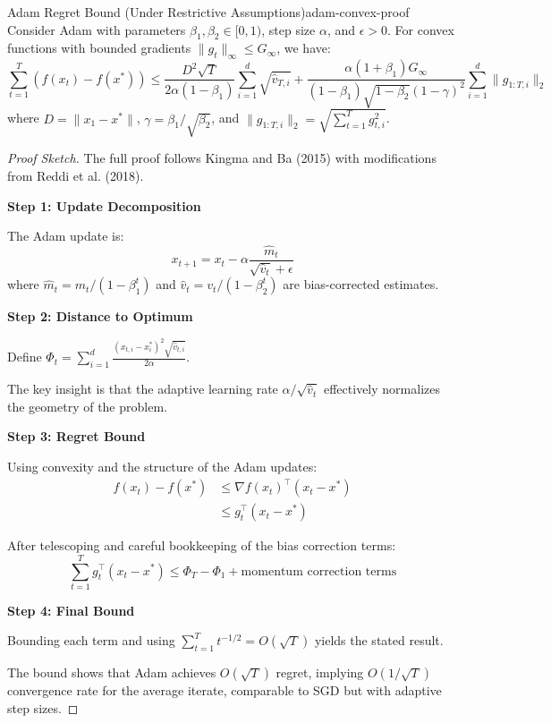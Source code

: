 \documentclass[../main.tex]{subfiles}
\begin{document}
\begin{theorem}{Adam Regret Bound (Under Restrictive Assumptions)}{adam-convex-proof}
Consider Adam with parameters $\beta_1, \beta_2 \in [0, 1)$, step size $\alpha$, and $\epsilon > 0$. For convex functions with bounded gradients $\|g_t\|_\infty \leq G_\infty$, we have:
\[
\sum_{t=1}^T (f(x_t) - f(x^*)) \leq \frac{D^2\sqrt{T}}{2\alpha(1-\beta_1)} \sum_{i=1}^d \sqrt{\hat{v}_{T,i}} + \frac{\alpha(1+\beta_1)G_\infty}{(1-\beta_1)\sqrt{1-\beta_2}(1-\gamma)^2} \sum_{i=1}^d \|g_{1:T,i}\|_2
\]
where $D = \|x_1 - x^*\|$, $\gamma = \beta_1/\sqrt{\beta_2}$, and $\|g_{1:T,i}\|_2 = \sqrt{\sum_{t=1}^T g_{t,i}^2}$.
\end{theorem}

\begin{proof}[Proof Sketch]
The full proof follows Kingma and Ba (2015) with modifications from Reddi et al. (2018).

\textbf{Step 1: Update Decomposition}

The Adam update is:
\[
x_{t+1} = x_t - \alpha \frac{\hat{m}_t}{\sqrt{\hat{v}_t} + \epsilon}
\]
where $\hat{m}_t = m_t/(1-\beta_1^t)$ and $\hat{v}_t = v_t/(1-\beta_2^t)$ are bias-corrected estimates.

\textbf{Step 2: Distance to Optimum}

Define $\Phi_t = \sum_{i=1}^d \frac{(x_{t,i} - x_i^*)^2\sqrt{\hat{v}_{t,i}}}{2\alpha}$.

The key insight is that the adaptive learning rate $\alpha/\sqrt{\hat{v}_t}$ effectively normalizes the geometry of the problem.

\textbf{Step 3: Regret Bound}

Using convexity and the structure of the Adam updates:
\begin{align}
f(x_t) - f(x^*) &\leq \nabla f(x_t)^\top(x_t - x^*) \\
&\leq g_t^\top(x_t - x^*)
\end{align}

After telescoping and careful bookkeeping of the bias correction terms:
\[
\sum_{t=1}^T g_t^\top(x_t - x^*) \leq \Phi_T - \Phi_1 + \text{momentum correction terms}
\]

\textbf{Step 4: Final Bound}

Bounding each term and using $\sum_{t=1}^T t^{-1/2} = O(\sqrt{T})$ yields the stated result.

The bound shows that Adam achieves $O(\sqrt{T})$ regret, implying $O(1/\sqrt{T})$ convergence rate for the average iterate, comparable to SGD but with adaptive step sizes.
\end{proof}
\end{document}

